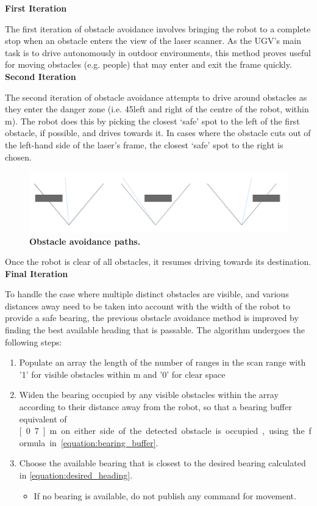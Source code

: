 \documentclass[titlepage,12pt,a4paper]{article}
\begin{document}
\textbf{First Iteration}

The first iteration of obstacle avoidance involves bringing the robot to a complete stop when an obstacle enters the view of the laser scanner. As the UGV's main task is to drive autonomously in outdoor environments, this method proves useful for moving obstacles (e.g. people) that may enter and exit the frame quickly. \\

\textbf{Second Iteration}

The second iteration of obstacle avoidance attempts to drive around obstacles as they enter the danger zone (i.e. 45\degree left and right of the centre of the robot, within \unit[2]{m}). The robot does this by picking the closest `safe' spot to the left of the first obstacle, if possible, and drives towards it. In cases where the obstacle cuts out of the left-hand side of the laser's frame, the closest `safe' spot to the right is chosen. 

\begin{figure}[h]
	\centering
	\includegraphics[scale=0.17]{figures/obstacle2.png}
	\caption{\textbf{Obstacle avoidance paths.}}
\end{figure}

Once the robot is clear of all obstacles, it resumes driving towards its destination. \\

\textbf{Final Iteration}

To handle the case where multiple distinct obstacles are visible, and various distances away need to be taken into account with the width of the robot to provide a safe bearing, the previous obstacle avoidance method is improved by finding the best available heading that is passable. The algorithm undergoes the following steps:

\begin{enumerate}
	\item Populate an array the length of the number of ranges in the scan range with '1' for visible obstacles within \unit[3]{m} and '0' for clear space
	\item Widen the bearing occupied by any visible obstacles within the array according to their distance away from the robot, so that a bearing buffer equivalent of \unit[0.7]{m} on either side of the detected obstacle is occupied, using the formula in \eqref{equation:bearing_buffer}.
	\item Choose the available bearing that is closest to the desired bearing calculated in \eqref{equation:desired_heading}.
	\begin{itemize}
		\item If no bearing is available, do not publish any command for movement.
	\end{itemize}
\end{enumerate}
\end{document}
